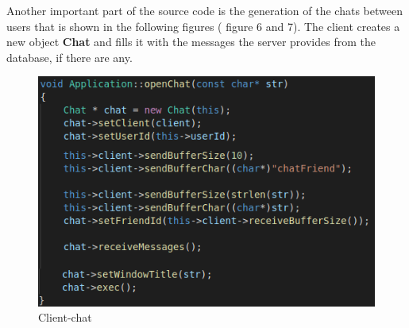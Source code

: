 \documentclass[runningheads]{llncs}
\begin{document}
\par Another important part of the source code is the generation of the chats between users that is shown in the following figures ( figure 6 and 7). The client creates a new object \textbf{Chat} and fills it with the messages the server provides from the database, if there are any. 

\begin{figure}[H]
\begin{center}
\includegraphics[]{images/client-chat.png}
\caption{Client-chat}
\end{center}
\end{figure}

\newpage
\end{document}
